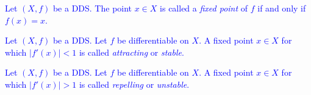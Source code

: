 \begin{definition}
\label{def:fixed point}
    \textcolor{blue}{
    Let $\left( X, f \right)$ be a DDS. The point $x \in X$ is called a \emph{fixed point} of $f$ if and only if $f(x) = x$.
    }
\end{definition}

\begin{definition}
\label{def:sfp}
    \textcolor{blue}{
    Let $\left(X, f\right)$ be a DDS.
    Let $f$ be differentiable on $X$. 
    A fixed point $x \in X$ for which  $|f'(x)| < 1$ is called \emph{attracting} or \emph{stable}.
    }
\end{definition}

\begin{definition}
\label{def:ufp}
    \textcolor{blue}{
    Let $\left(X, f\right)$ be a DDS.
    Let $f$ be differentiable on $X$. 
    A fixed point $x \in X$ for which $|f'(x)| > 1$ is called \emph{repelling} or \emph{unstable}.
    }
\end{definition}

